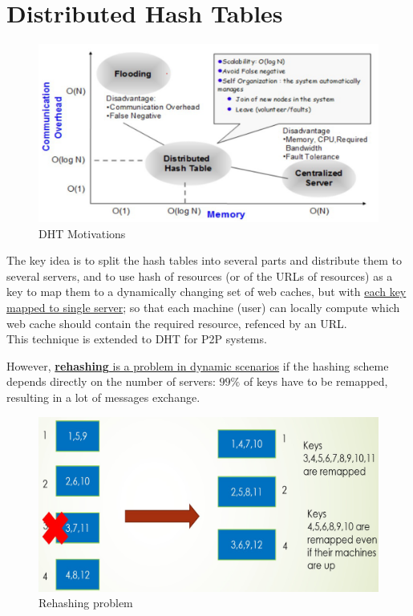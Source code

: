 \chapter{Distributed Hash Tables}
\begin{figure}[htbp]
   \centering
   \includegraphics{images/DHT_motivations.png}
   \caption{DHT Motivations}
   \label{fig:DHT_motivations}
\end{figure}

The key idea is to split the hash tables into several parts and distribute them to several servers, and to use hash of resources (or of the URLs of resources) as a key to map them to a
dynamically changing set of web caches, but with \ul{each key mapped to single server}; so that
each machine (user) can locally compute which web cache should contain the
required resource, refenced by an URL.\\
This technique is extended to DHT for P2P systems.

However, \ul{\textbf{rehashing} is a problem in dynamic scenarios} if the hashing scheme depends directly on the number of servers:
$99\%$ of keys have to be remapped, resulting in a lot of messages exchange.
\begin{figure}[htbp]
   \centering
   \includegraphics{images/rehashing_problem.png}
   \caption{Rehashing problem}
   \label{fig:rehashing_problem}
\end{figure}

